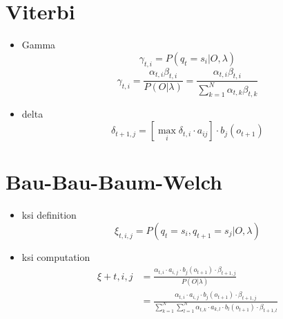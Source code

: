 \documentclass[10pt]{article}
\begin{document}
\section{Viterbi}
\label{sec:viterbi}

\begin{itemize}
\item Gamma
  \begin{equation}
    \label{eq:gamma_def}
    \gamma_{t,i}=P(q_t = s_i \vert O, \lambda)
  \end{equation}
  \begin{equation}
    \label{eq:gamma_formula}
    \gamma_{t,i}=\frac{\alpha_{t,i}\beta_{t,i}}{P(O\vert \lambda)} =
    \frac{\alpha_{t,i}\beta_{t,i}}{\displaystyle\sum_{k=1}^{N}\alpha_{t,k}\beta_{t,k}}
  \end{equation}
\item delta
  \begin{equation}
    \label{eq:delta}
    \delta_{t+1,j}=[\displaystyle \max_{i} \delta_{t,i} \cdot a_{ij}] \cdot b_j(o_{t+1})
  \end{equation}

\end{itemize}

\section{Bau-Bau-Baum-Welch}
\label{sec:baum}

\begin{itemize}
\item ksi definition
  \begin{equation}
    \label{eq:ksi_def}
    \xi_{t,i,j} = P(q_t=s_i,q_{t+1}=s_j \vert O, \lambda)
  \end{equation}
\item ksi computation
  \begin{equation}
    \label{eq:ksi_comp}
    \begin{split}
      \xi+{t,i,j} & = \frac{\alpha_{t,i}\cdot a_{i,j} \cdot
        b_j(o_{t+1}) \cdot \beta_{t+1,j}}
      {P(O \vert \lambda)} \\
      & = \frac{\alpha_{t,i}\cdot a_{i,j} \cdot b_j(o_{t+1}) \cdot
        \beta_{t+1,j}}{
        \displaystyle\sum_{k=1}^{N}\displaystyle\sum_{l=1}^{N}
        \alpha_{t,k}\cdot a_{k,l} \cdot b_l(o_{t+1}) \cdot
        \beta_{t+1,l}}
    \end{split}
  \end{equation}


\end{itemize}
\end{document}
